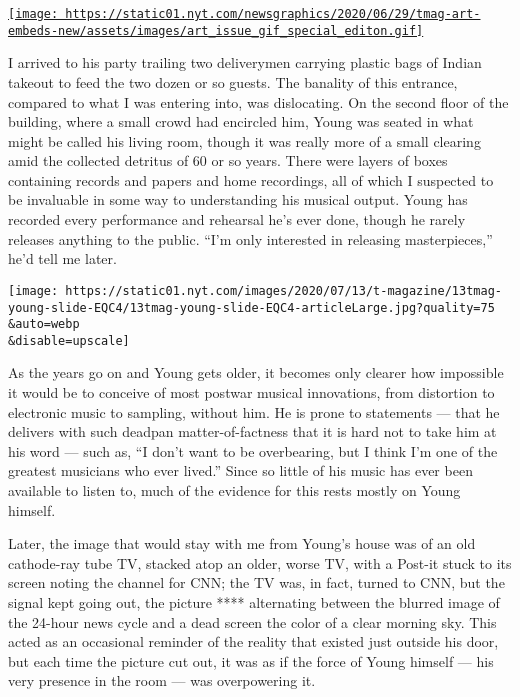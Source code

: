 \href{https://www.nytimes.com/issue/t-magazine/2020/07/02/true-believers-art-issue}{\texttt{[image: https://static01.nyt.com/newsgraphics/2020/06/29/tmag-art-embeds-new/assets/images/art\_issue\_gif\_special\_editon.gif]}}

I arrived to his party trailing two deliverymen carrying plastic bags of
Indian takeout to feed the two dozen or so guests. The banality of this
entrance, compared to what I was entering into, was dislocating. On the
second floor of the building, where a small crowd had encircled him,
Young was seated in what might be called his living room, though it was
really more of a small clearing amid the collected detritus of 60 or so
years. There were layers of boxes containing records and papers and home
recordings, all of which I suspected to be invaluable in some way to
understanding his musical output. Young has recorded every performance
and rehearsal he's ever done, though he rarely releases anything to the
public. ``I'm only interested in releasing masterpieces,'' he'd tell me
later.

\texttt{[image: https://static01.nyt.com/images/2020/07/13/t-magazine/13tmag-young-slide-EQC4/13tmag-young-slide-EQC4-articleLarge.jpg?quality=75\\\&auto=webp\\\&disable=upscale]}

As the years go on and Young gets older, it becomes only clearer how
impossible it would be to conceive of most postwar musical innovations,
from distortion to electronic music to sampling, without him. He is
prone to statements --- that he delivers with such deadpan
matter-of-factness that it is hard not to take him at his word --- such
as, ``I don't want to be overbearing, but I think I'm one of the
greatest musicians who ever lived.'' Since so little of his music has
ever been available to listen to, much of the evidence for this rests
mostly on Young himself.

Later, the image that would stay with me from Young's house was of an
old cathode-ray tube TV, stacked atop an older, worse TV, with a Post-it
stuck to its screen noting the channel for CNN; the TV was, in fact,
turned to CNN, but the signal kept going out, the picture ****
alternating between the blurred image of the 24-hour news cycle and a
dead screen the color of a clear morning sky. This acted as an
occasional reminder of the reality that existed just outside his door,
but each time the picture cut out, it was as if the force of Young
himself --- his very presence in the room --- was overpowering it.

